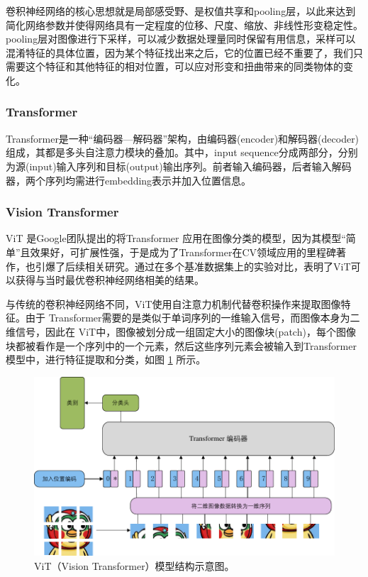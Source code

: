 \documentclass[a4paper]{zreport}
\begin{document}
卷积神经网络的核心思想就是局部感受野、是权值共享和pooling层，以此来达到简化网络参数并使得网络具有一定程度的位移、尺度、缩放、非线性形变稳定性。pooling层对图像进行下采样，可以减少数据处理量同时保留有用信息，采样可以混淆特征的具体位置，因为某个特征找出来之后，它的位置已经不重要了，我们只需要这个特征和其他特征的相对位置，可以应对形变和扭曲带来的同类物体的变化。

\subsubsection{Transformer}

Transformer是一种“编码器—解码器”架构，由编码器(encoder)和解码器(decoder)组成，其都是多头自注意力模块的叠加。其中，input sequence分成两部分，分别为源(input)输入序列和目标(output)输出序列。前者输入编码器，后者输入解码器，两个序列均需进行embedding表示并加入位置信息。


\subsubsection{Vision Transformer}

ViT \cite{dosovitskiy2020image} 是Google团队提出的将Transformer \cite{vaswani2017attention} 应用在图像分类的模型，因为其模型“简单”且效果好，可扩展性强，于是成为了Transformer在CV领域应用的里程碑著作，也引爆了后续相关研究。通过在多个基准数据集上的实验对比，表明了ViT可以获得与当时最优卷积神经网络相美的结果。

与传统的卷积神经网络不同，ViT使用自注意力机制代替卷积操作来提取图像特征。由于 Transformer需要的是类似于单词序列的一维输入信号，而图像本身为二维信号，因此在 ViT中，图像被划分成一组固定大小的图像块(patch)，每个图像块都被看作是一个序列中的一个元素，然后这些序列元素会被输入到Transformer 模型中，进行特征提取和分类，如图 \ref{fig:vit} 所示。

\begin{figure}[h]
\centering
\includegraphics[width=0.9\linewidth]{figures/vit}
\caption{ViT（Vision Transformer）模型结构示意图。}
\label{fig:vit}
\end{figure}
\end{document}
